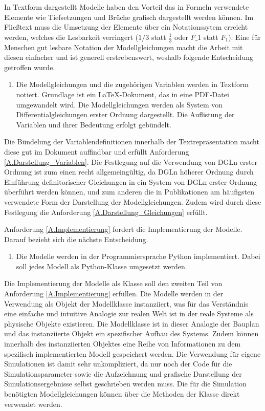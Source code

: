 In Textform dargestellt Modelle haben den Vorteil das in Formeln verwendete Elemente wie Tiefsetzungen und Brüche grafisch dargestellt werden können. Im Fließtext muss die Umsetzung der Elemente über ein Notationssytem erreicht werden, welches die Lesbarkeit verringert ($1/3$ statt $\frac{1}{3}$ oder $F\_1$ statt $F_1$). Eine für Menschen gut lesbare Notation der Modellgleichungen macht die Arbeit mit diesen einfacher und ist generell erstrebenswert, weshalb folgende Entscheidung getroffen wurde. 
\begin{enumerate}[resume*]
	\item \label{E.Textdok}Die Modellgleichungen und die zugehörigen Variablen werden in Textform notiert. Grundlage ist ein \LaTeX-Dokument, das in eine PDF-Datei umgewandelt wird. Die Modellgleichungen werden als System von Differentialgleichungen erster Ordnung dargestellt. Die Auflistung der Variablen und ihrer Bedeutung erfolgt gebündelt.
\end{enumerate}
Die Bündelung der Variablendefinitionen innerhalb der Textrepräsentation macht diese gut im Dokument auffindbar und erfüllt Anforderung \ref{A.Darstellung_Variablen}. Die Festlegung auf die Verwendung von DGLn erster Ordnung ist zum einen recht allgemeingültig, da DGLn höherer Ordnung durch Einführung definitorischer Gleichungen in ein System von DGLn erster Ordnung überführt werden können, und zum anderen die in Publikationen am häufigsten verwendete Form der Darstellung der Modellgleichungen. Zudem wird durch diese Festlegung die Anforderung \ref{A.Darstellung_Gleichungen} erfüllt.

Anforderung \ref{A.Implementierung} fordert die Implementierung der Modelle. Darauf bezieht sich die nächste Entscheidung.
\begin{enumerate}[resume*]
	\item \label{E.Implementation}Die Modelle werden in der Programmiersprache Python implementiert. Dabei soll jedes Modell als Python-Klasse umgesetzt werden.
\end{enumerate}
Die Implementierung der Modelle als Klasse soll den zweiten Teil von Anforderung \ref{A.Implementierung} erfüllen. Die Modelle werden in der Verwendung als Objekt der Modellklasse instanziiert, was für das Verständnis eine einfache und intuitive Analogie zur realen Welt ist in der reale Systeme als physische Objekte existieren. Die Modellklasse ist in dieser Analogie der Bauplan und das instanziierte Objekt ein spezifischer Aufbau des Systems. Zudem können innerhalb des instanziierten Objektes eine Reihe von Informationen zu dem spezifisch implementierten Modell gespeichert werden. Die Verwendung für eigene Simulationen ist damit sehr unkompliziert, da nur noch der Code für die Simulationsparameter sowie die Aufzeichnung und grafische Darstellung der Simulationsergebnisse selbst geschrieben werden muss. Die für die Simulation benötigten Modellgleichungen können über die Methoden der Klasse direkt verwendet werden.

